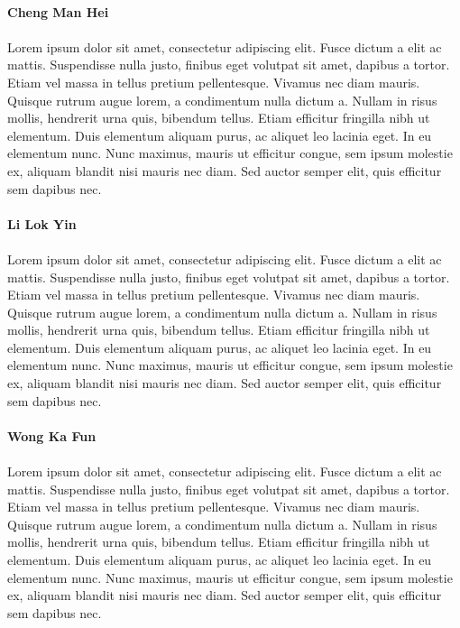 \\
\textbf{Cheng Man Hei}
\\
\\
Lorem ipsum dolor sit amet, consectetur adipiscing elit. Fusce dictum a elit ac mattis. Suspendisse nulla justo, finibus eget volutpat sit amet, dapibus a tortor. Etiam vel massa in tellus pretium pellentesque. Vivamus nec diam mauris. Quisque rutrum augue lorem, a condimentum nulla dictum a. Nullam in risus mollis, hendrerit urna quis, bibendum tellus. Etiam efficitur fringilla nibh ut elementum. Duis elementum aliquam purus, ac aliquet leo lacinia eget. In eu elementum nunc. Nunc maximus, mauris ut efficitur congue, sem ipsum molestie ex, aliquam blandit nisi mauris nec diam. Sed auctor semper elit, quis efficitur sem dapibus nec.
\\
\\
\textbf{Li Lok Yin}
\\
\\
Lorem ipsum dolor sit amet, consectetur adipiscing elit. Fusce dictum a elit ac mattis. Suspendisse nulla justo, finibus eget volutpat sit amet, dapibus a tortor. Etiam vel massa in tellus pretium pellentesque. Vivamus nec diam mauris. Quisque rutrum augue lorem, a condimentum nulla dictum a. Nullam in risus mollis, hendrerit urna quis, bibendum tellus. Etiam efficitur fringilla nibh ut elementum. Duis elementum aliquam purus, ac aliquet leo lacinia eget. In eu elementum nunc. Nunc maximus, mauris ut efficitur congue, sem ipsum molestie ex, aliquam blandit nisi mauris nec diam. Sed auctor semper elit, quis efficitur sem dapibus nec.
\\
\\
\textbf{Wong Ka Fun}
\\
\\
Lorem ipsum dolor sit amet, consectetur adipiscing elit. Fusce dictum a elit ac mattis. Suspendisse nulla justo, finibus eget volutpat sit amet, dapibus a tortor. Etiam vel massa in tellus pretium pellentesque. Vivamus nec diam mauris. Quisque rutrum augue lorem, a condimentum nulla dictum a. Nullam in risus mollis, hendrerit urna quis, bibendum tellus. Etiam efficitur fringilla nibh ut elementum. Duis elementum aliquam purus, ac aliquet leo lacinia eget. In eu elementum nunc. Nunc maximus, mauris ut efficitur congue, sem ipsum molestie ex, aliquam blandit nisi mauris nec diam. Sed auctor semper elit, quis efficitur sem dapibus nec.
\\
\\